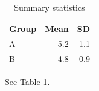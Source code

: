 \documentclass{article}
\begin{document}
\begin{table}[h]
  \centering
  \caption{Summary statistics}
  \label{tab:stats}
  \begin{tabular}{lrr}
    \hline
    Group & Mean & SD \\
    \hline
    A & 5.2 & 1.1 \\
    B & 4.8 & 0.9 \\
    \hline
  \end{tabular}
\end{table}
See Table \ref{tab:stats}.
\end{document}
